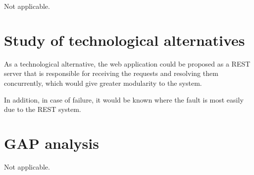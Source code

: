 Not applicable.


\section{Study of technological alternatives}

As a technological alternative, the web application could be proposed as a REST server that is responsible for receiving the requests and resolving them concurrently, which would give greater modularity to the system.

In addition, in case of failure, it would be known where the fault is most easily due to the REST system.

\section{GAP analysis}

Not applicable.

